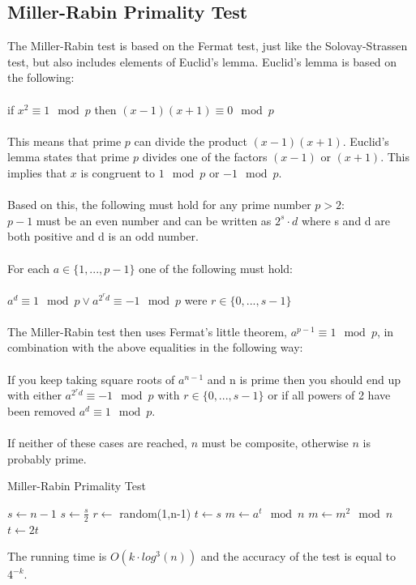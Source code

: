 \documentclass[compressed,final,notitlepage,narroweqnarray,inline,twoside,]{ieee}
\begin{document}
\subsection{Miller-Rabin Primality Test}
The Miller-Rabin test \cite{MR} is based on the Fermat test, just like the Solovay-Strassen test, but also includes elements of Euclid’s lemma.  Euclid’s lemma is based on the following:\\\\
if $x^2 \equiv 1 \mod p	$ then $(x-1)(x+1) \equiv 0 \mod p$\\\\
This means that prime $p$ can divide the product $(x-1)(x+1)$. Euclid’s lemma states that prime $p$ divides one of the factors $(x-1)$ or $(x+1)$. This implies that $x$ is congruent to $1 \mod p$ or $-1 \mod p$.\\\\ Based on this, the following must hold for any prime number $p>2$:\\
$p-1$ must be an even number and can be written as $2^s\cdot d$ where s and d are both positive and d is an odd number.\\\\
For each $a \in \{1,...,p-1\}$ one of the following must hold:\\\\
$a^d \equiv 1 \mod p \vee a^{2^rd} \equiv -1 \mod p$ were $r \in \{0,...,s-1\}$\\\\
The Miller-Rabin test then uses Fermat’s little theorem, $a^{p-1} \equiv 1 \mod p$, in combination with the above equalities in the following way:\\\\
If you keep taking square roots of $a^{n-1}$ and n is prime then you should end up with either $a^{2^rd} \equiv -1 \mod p$ with $r\in \{0,...,s-1\}$ or if all powers of 2 have been removed $a^d \equiv 1 \mod p$. \\\\
If neither of these cases are reached, $n$ must be composite, otherwise $n$ is probably prime.

\begin{algorithm}[ht]
 \caption{Miller-Rabin Primality Test}
 $s \longleftarrow n-1$ \;
 {
 	$s \longleftarrow \frac{s}{2}$\;
 }
 {
	$r \longleftarrow$ random(1,n-1) \;
	$t \longleftarrow s$\;
	$m \longleftarrow a^t \mod n$ \;
	 {
	 	$m \longleftarrow m^2 \mod n$ \;
	 	$t \longleftarrow 2t$
	 }
	{
		\;
	}
 }
 \;
\end{algorithm}
The running time is $O(k\cdot log^3(n))$ and the accuracy of the test is equal to $4^{-k}$.
\end{document}
